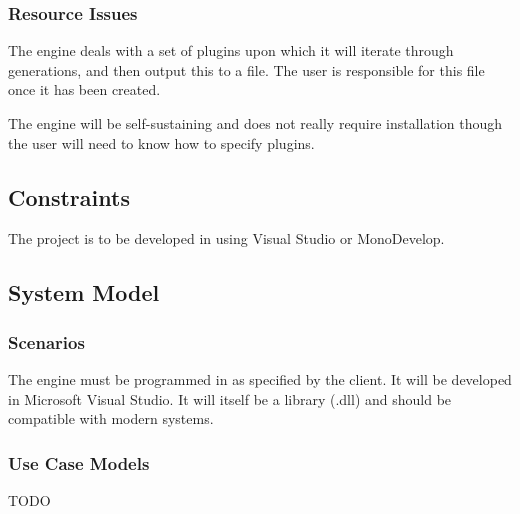 \subsubsection{Resource Issues}
The engine deals with a set of plugins upon which it will iterate through generations, and then output this to a file. The user is responsible for this file once it has been created. 

The engine will be self-sustaining and does not really require installation though the user will need to know how to specify plugins.

\subsection{Constraints}
The project is to be developed in \csharp using Visual Studio or MonoDevelop.
\subsection{System Model}

\subsubsection{Scenarios}
The engine must be programmed in \csharp as specified by the client. It will be developed in Microsoft Visual Studio. It will itself be a library (.dll) and should be compatible with modern systems.

\subsubsection{Use Case Models}
TODO
